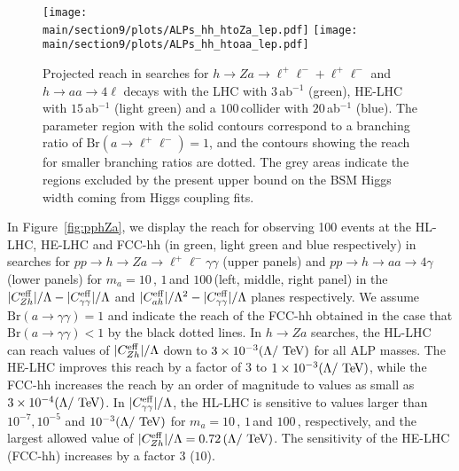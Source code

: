 %
\begin{figure}[t]
\begin{center}
\texttt{[image: \\main/section9/plots/ALPs\_hh\_htoZa\_lep.pdf]}
\texttt{[image: \\main/section9/plots/ALPs\_hh\_htoaa\_lep.pdf]}
\end{center}
\vspace{-3mm}
\caption{\label{fig:pphZalep} Projected reach in searches for $h \to Za \to \ell^+\ell^-+\ell^+\ell^- $ and $h \to aa \to 4\ell $ decays with the LHC with $3$\,ab$^{-1}$
(green), HE-LHC with $15$\,ab$^{-1}$ (light green) and a $100\,$\UTeV collider with $20$\,ab$^{-1}$ (blue). The parameter region with the solid contours correspond to a branching ratio of $\text{Br}(a\to 
\ell^+\ell^-)=1$, and the contours showing the reach for smaller branching ratios are dotted. The grey areas indicate the regions excluded by the present upper bound on the BSM Higgs width coming from Higgs coupling fits.}
\end{figure}
%

In Figure~\ref{fig:pphZa}, we display the reach for observing 100 events at the HL-LHC, HE-LHC and FCC-hh (in green, light green and blue respectively) in searches for $pp\to h \to Za\to \ell^+\ell^-\gamma\gamma$ (upper panels) and  $pp\to h \to aa\to 4 \gamma$ (lower panels) for $m_a= 10\,$\UGeV, $1\,$\UGeV and $100\,$\UMeV (left, middle, right panel) in the $|C_{Zh}^{\rm eff}|/\Lambda - |C_{\gamma\gamma}^{\rm eff}|/\Lambda$ and $|C_{ah}^{\rm eff}|/\Lambda^2 - |C_{\gamma\gamma}^{\rm eff}|/\Lambda$ planes respectively. We assume $\text{Br}(a\to \gamma\gamma)=1$ and indicate the reach of the FCC-hh obtained in the case that $\text{Br}(a\to \gamma\gamma)<1$ by the black dotted lines. 
In $h \to Za$ searches, the HL-LHC can reach values of $|C_{Zh}^{\rm eff}|/\Lambda$ down to $3 \times 10^{-3} (\Lambda/\textrm{\ensuremath{~\text{TeV}}})$ for all ALP masses. The HE-LHC improves this reach by a factor of $3$ to $1 \times 10^{-3} (\Lambda/\textrm{\ensuremath{~\text{TeV}}})$, while the FCC-hh increases the reach by an order of magnitude to values as small as $3 \times 10^{-4} (\Lambda/\textrm{\ensuremath{~\text{TeV}}})$. In $|C_{\gamma\gamma}^{\rm eff}|/\Lambda$, the HL-LHC is sensitive to values larger than $10^{-7}, 10^{-5}$ and $10^{-3} (\Lambda/\textrm{\ensuremath{~\text{TeV}}})$ for $m_a = 10\,$\UGeV, $1\,$\UGeV and $100\,$\UMeV, respectively, and the largest allowed value of $|C_{Zh}^{\rm eff}|/\Lambda = 0.72\,(\Lambda/\textrm{\ensuremath{~\text{TeV}}})$. The sensitivity of the HE-LHC (FCC-hh) increases by a factor $3$ ($10$). 

